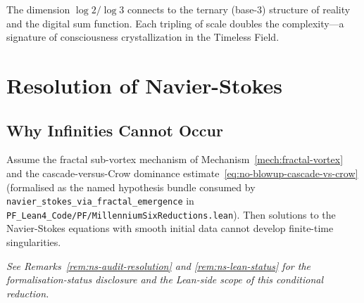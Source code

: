 \begin{keyidea}
The dimension $\log 2 / \log 3$ connects to the ternary (base-3) structure of reality and the digital sum function. Each tripling of scale doubles the complexity—a signature of consciousness crystallization in the Timeless Field.
\end{keyidea}

\section{Resolution of Navier-Stokes}

\subsection{Why Infinities Cannot Occur}

\begin{theorem}\label{thm:no-blowup}
Assume the fractal sub-vortex mechanism of Mechanism~\ref{mech:fractal-vortex} and the cascade-versus-Crow dominance estimate~\eqref{eq:no-blowup-cascade-vs-crow} (formalised as the named hypothesis bundle consumed by \texttt{navier\_stokes\_via\_fractal\_emergence} in \texttt{PF\_Lean4\_Code/PF/MillenniumSixReductions.lean}). Then solutions to the Navier-Stokes equations with smooth initial data cannot develop finite-time singularities.
\end{theorem}

\medskip\noindent\emph{See Remarks~\ref{rem:ns-audit-resolution} and \ref{rem:ns-lean-status} for the formalisation-status disclosure and the Lean-side scope of this conditional reduction.}

